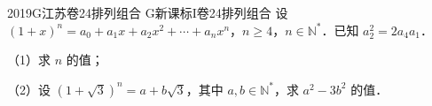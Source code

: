 
\begin{problem}{2019}{G}{江苏卷}{24}{排列组合}
{G}{新课标I卷}{24}{排列组合}
设 $(1+x)^n = a_0 + a_1x + a_2x^2 + \cdots + a_nx^n$，$n\geq 4$，$n\in\mathbb{N}^*$．已知 $a_2^2 = 2a_4a_1$．

（1）求 $n$ 的值；

（2）设 $(1+\sqrt{3})^n = a + b\sqrt{3}$，其中 $a,b\in\mathbb{N}^*$，求 $a^2 - 3b^2$ 的值．
\end{problem}